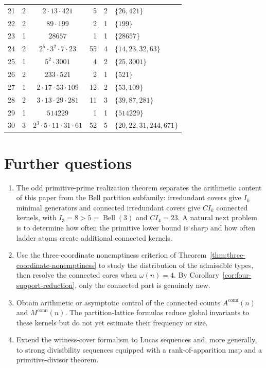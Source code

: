 \documentclass[11pt,letterpaper]{article}
\numberwithin{equation}{section}
\theoremstyle{plain}
\theoremstyle{definition}
\theoremstyle{remark}
\begin{document}
\begin{table}[ht]
\begin{tabular}{rrcrrl}
 21 & 2 & $2\cdot 13\cdot 421$ & 5 & 2 & $\{26,421\}$\\
 22 & 2 & $89\cdot 199$ & 2 & 1 & $\{199\}$\\
 23 & 1 & $28657$ & 1 & 1 & $\{28657\}$\\
 24 & 2 & $2^5\cdot 3^2\cdot 7\cdot 23$ & 55 & 4 & $\{14,23,32,63\}$\\
 25 & 1 & $5^2\cdot 3001$ & 4 & 2 & $\{25,3001\}$\\
 26 & 2 & $233\cdot 521$ & 2 & 1 & $\{521\}$\\
 27 & 1 & $2\cdot 17\cdot 53\cdot 109$ & 12 & 2 & $\{53,109\}$\\
 28 & 2 & $3\cdot 13\cdot 29\cdot 281$ & 11 & 3 & $\{39,87,281\}$\\
 29 & 1 & $514229$ & 1 & 1 & $\{514229\}$\\
 30 & 3 & $2^3\cdot 5\cdot 11\cdot 31\cdot 61$ & 52 & 5 &
$\{20,22,31,244,671\}$\\
\bottomrule
\end{tabular}
\end{table}

\section{Further questions}\label{sec:questions}

\begin{enumerate}[label=(\arabic*)]
\item The odd primitive-prime realization theorem separates the arithmetic
content of this paper from the Bell partition subfamily: irredundant covers
give $I_k$ minimal generators and connected irredundant covers give $CI_k$
connected kernels, with $I_3=8>5=\operatorname{Bell}(3)$ and $CI_4=23$. A
natural next problem is to determine how often the primitive lower bound is
sharp and how often ladder atoms create additional connected kernels.
\item Use the three-coordinate nonemptiness criterion of
Theorem~\ref{thm:three-coordinate-nonemptiness} to study the distribution of
the admissible types, then resolve the connected cores when $\omega(n)=4$. By
Corollary~\ref{cor:four-support-reduction}, only the connected part is
genuinely new.
\item Obtain arithmetic or asymptotic control of the connected counts
$A^{\mathrm{conn}}(n)$ and $M^{\mathrm{conn}}(n)$. The partition-lattice
formulas reduce global invariants to these kernels but do not yet estimate
their frequency or size.
\item Extend the witness-cover formalism to Lucas sequences and, more
generally, to strong divisibility sequences equipped with a
rank-of-apparition map and a primitive-divisor theorem.
\end{enumerate}
\end{document}
